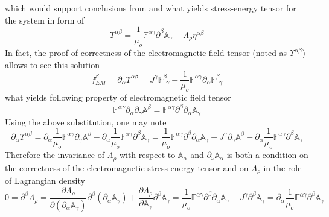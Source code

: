 \documentclass[aps,prx,preprint,groupedaddress,showkeys]{revtex4-2}
\begin{document}
which would support conclusions from \cite{ALL1} and what yields stress-energy tensor for the system in form of
\begin{equation} \label{TensSep1}
T^{\alpha \beta} = \frac{1}{\mu_o}\mathbb{F}^{\alpha \gamma} \partial^{\beta} \mathbb{A}_{\gamma} -  \Lambda_{\rho} \eta^{\alpha \beta}
\end{equation}
In fact, the proof of correctness of the electromagnetic field tensor (noted as $\Upsilon^{\alpha \beta}$) allows to see this solution
\begin{equation} \label{Ups1}
f_{EM}^{\beta} = \partial_{\alpha} \Upsilon^{\alpha \beta} = J^{\gamma}\mathbb{F}^{\beta}_{\, \, \, \gamma} - \frac{1}{\mu_o}\mathbb{F}^{\alpha \gamma} \partial_{\alpha} \mathbb{F}^{\beta}_{\, \, \, \gamma}
\end{equation}
what yields following property of electromagnetic field tensor
\begin{equation} \label{Ups2}
\mathbb{F}^{\alpha \gamma} \partial_{\alpha} \partial_{\gamma} \mathbb{A}^{\beta} 
 = \mathbb{F}^{\alpha \gamma}  \partial^{\beta} \partial_{\alpha} \mathbb{A}_{\gamma} \end{equation}
Using the above substitution, one may note
\begin{equation} \label{TensorProof}
\partial_{\alpha} \Upsilon^{\alpha \beta} = \partial_{\alpha} \frac{1}{\mu_o} \mathbb{F}^{\alpha \gamma} \partial_{\gamma} \mathbb{A}^{\beta} - \partial_{\alpha} \frac{1}{\mu_o} \mathbb{F}^{\alpha \gamma} \partial^{\beta} \mathbb{A}_{\gamma} = \frac{1}{\mu_o} \mathbb{F}^{\alpha \gamma} \partial^{\beta} \partial_{\alpha} \mathbb{A}_{\gamma} - J^{\gamma}\partial_{\gamma} \mathbb{A}^{\beta} - \partial_{\alpha} \frac{1}{\mu_o} \mathbb{F}^{\alpha \gamma} \partial^{\beta} \mathbb{A}_{\gamma}
\end{equation}
Therefore the invariance of $\Lambda_{\rho}$ with respect to $\mathbb{A}_{\alpha}$ and  $\partial_{\nu} \mathbb{A}_{\alpha}$ is both a condition on the correctness of the electromagnetic stress-energy tensor and on $\Lambda_{\rho}$ in the role of Lagrangian density
\begin{equation} \label{TENSCORR}
0 = \partial^{\beta} \Lambda_{\rho} = \frac{\partial \Lambda_{\rho}}{\partial (\partial_{\alpha} \mathbb{A}_{\gamma})} \partial^{\beta} (\partial_{\alpha} \mathbb{A}_{\gamma}) + \frac{\partial \Lambda_{\rho}} {\partial \mathbb{A}_{\gamma}} \partial^{\beta} \mathbb{A}_{\gamma} = \frac{1}{\mu_o} \mathbb{F}^{\alpha \gamma} \partial^{\beta} \partial_{\alpha} \mathbb{A}_{\gamma}  - J^{\gamma} \partial^{\beta} \mathbb{A}_{\gamma} = \partial_{\alpha} \frac{1}{\mu_o} \mathbb{F}^{\alpha \gamma} \partial^{\beta} \mathbb{A}_{\gamma}
\end{equation}
\end{document}
